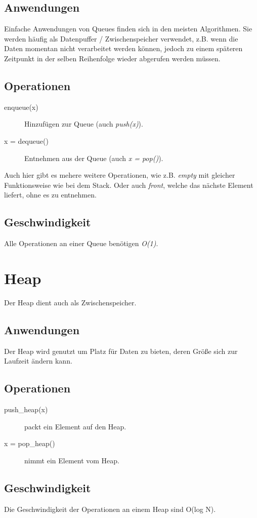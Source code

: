\documentclass{book}
\begin{document}
\subsection{Anwendungen}
Einfache Anwendungen von Queues finden sich in den meisten Algorithmen.
Sie werden häufig als Datenpuffer / Zwischenspeicher verwendet, z.B. wenn die Daten momentan nicht verarbeitet werden können, jedoch zu einem späteren Zeitpunkt in der selben Reihenfolge wieder abgerufen werden müssen.


\subsection{Operationen}
\begin{description}
	\item[enqueue(x)] Hinzufügen zur Queue (auch \textit{push(x)}).
	\item[x = dequeue()] Entnehmen aus der Queue (auch \textit{x = pop()}).   
\end{description}
Auch hier gibt es mehere weitere Operationen, wie z.B. \textit{empty} mit gleicher Funktionsweise wie bei dem Stack. Oder auch \textit{front}, welche das nächste Element liefert, ohne es zu entnehmen.
\subsection{Geschwindigkeit}
Alle Operationen an einer Queue benötigen \textit{O(1)}.

\section{Heap}
Der Heap dient auch als Zwischenspeicher.
\subsection{Anwendungen}
Der Heap wird genutzt um Platz für Daten zu bieten, deren Größe sich zur Laufzeit ändern kann.
\subsection{Operationen}
\begin{description}
	\item[push\_heap(x)] packt ein Element auf den Heap.
	\item[x = pop\_heap()] nimmt ein Element vom Heap. 
\end{description}
\subsection{Geschwindigkeit}
Die Geschwindigkeit der Operationen an einem Heap sind O(log N).
\end{document}
